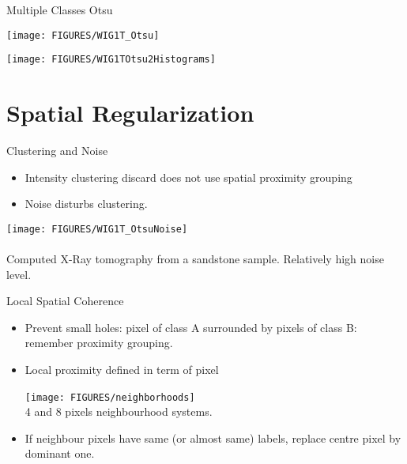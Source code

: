 \documentclass[9pt]{beamer}
\newcommand{\myemph}[1]{{\color{blue}{#1}}}
\begin{document}
\begin{frame}[t]{Multiple Classes Otsu}
  \begin{center}
    \texttt{[image: FIGURES/WIG1T\_Otsu]}
  \end{center}
  \begin{center}
    \texttt{[image: FIGURES/WIG1TOtsu2Histograms]}
  \end{center}
\end{frame}





\section{Spatial Regularization}


\begin{frame}[t]{Clustering and Noise}
  \begin{itemize}
  \item Intensity clustering discard does not use spatial proximity grouping
  \item Noise disturbs clustering.
  \end{itemize}
  \begin{center}
    \texttt{[image: FIGURES/WIG1T\_OtsuNoise]}\\
    ~\\
    Computed X-Ray tomography from a sandstone sample. Relatively high noise level.
  \end{center}
\end{frame}


\begin{frame}[t]{Local Spatial Coherence}
  \begin{itemize}
  \item Prevent small holes: pixel of class A surrounded by pixels of class B: remember proximity grouping.\vfill
  \item Local proximity defined in term of pixel \myemph{neighborhoods}\vfill
    \begin{center}
      \texttt{[image: FIGURES/neighborhoods]}~\\
      4 and 8 pixels neighbourhood systems.
    \end{center}\vfill
  \item If neighbour pixels have same (or almost same) labels, replace centre pixel by dominant one.
  \end{itemize}
\end{frame}
\end{document}
